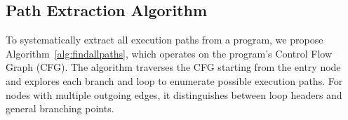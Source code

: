 \documentclass[letterpaper]{article} %
\begin{document}





\subsection{Path Extraction Algorithm}
\label{sec:PathStore}
To systematically extract all execution paths from a program, we propose Algorithm~\ref{alg:findallpaths}, which operates on the program's Control Flow Graph (CFG).  
The algorithm traverses the CFG starting from the entry node and explores each branch and loop to enumerate possible execution paths. For nodes with multiple outgoing edges, it distinguishes between loop headers and general branching points.  
\end{document}
